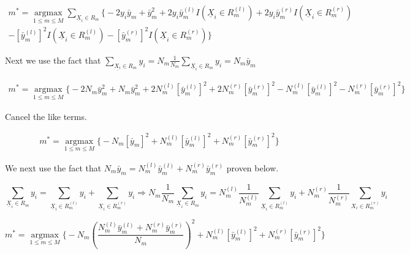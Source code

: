 \documentclass[11pt]{article}
\begin{document}
\begin{equation}
\begin{split}
m^* = \underset{1 \leq m \leq M}{\operatorname{argmax}} 
\sum_{\underline{X}_i \in R_m} \Bigg\{-2y_i\bar{y}_m + \bar{y}_m^2 + 
2y_i\bar{y}_m^{(l)}I(\underline{X}_i \in R_m^{(l)}) + 
2y_i\bar{y}_m^{(r)}I(\underline{X}_i \in R_m^{(r)})\\ 
- [\bar{y}_m^{(l)}]^2I(\underline{X}_i \in R_m^{(l)}) - 
[\bar{y}_m^{(r)}]^2I(\underline{X}_i \in R_m^{(r)})\Bigg\}
\end{split}
\end{equation}

Next we use the fact that 
$\sum_{\underline{X_i} \in R_m} y_i = N_m\frac{1}{N_m} 
\sum_{\underline{X}_i \in R_m}y_i = N_m \bar{y}_m$

\begin{equation}
\begin{split}
m^* = \underset{1 \leq m \leq M}{\operatorname{argmax}} 
\Bigg\{-2N_m\bar{y}_m^2 +N_m\bar{y}_m^2 + 2N_m^{(l)}[\bar{y}_m^{(l)}]^2 +
 2N_m^{(r)}[\bar{y}_m^{(r)}]^2  -N_m^{(l)}[\bar{y}_m^{(l)}]^2 -N_m^{(r)}
 [\bar{y}_m^{(r)}]^2\Bigg\}
\end{split}
\end{equation}

Cancel the like terms. 

\begin {equation}
\begin{split}
m^* = \underset{1 \leq m \leq M}{\operatorname{argmax}} 
\Bigg\{-N_m[\bar{y}_m]^2 + N_m^{(l)}[\bar{y}_m^{(l)}]^2 
+N_m^{(r)}[\bar{y}_m^{(r)}]^2\Bigg\}
\end{split}
\end{equation}

We next use the fact that $N_m\bar{y}_m = N_m^{(l)}\bar{y}_m^{(l)} + 
N_m^{(r)}\bar{y}_m^{(r)}$ proven below.

$$ \sum_{\underline{X}_i \in R_m} y_i = \sum_{\underline{X}_i 
\in R_m^{(l)}}y_i + \sum_{\underline{X}_i \in R_m^{(r)}} y_i 
\Rightarrow N_m \frac{1}{N_m} \sum_{\underline{X}_i 
\in R_m}y_i = N_m^{(l)}\frac{1}{N_m^{(l)}} 
\sum_{\underline{X}_i \in R_m^{(l)}}y_i + N_m^{(r)}\frac{1}
{N_m^{(r)}}\sum_{X_i \in R_m^{(r)}}y_i $$

\begin {equation}
m^* = \underset{1 \leq m \leq M}{\operatorname{argmax}} 
\Bigg\{ -N_m ( \frac{N_m^{(l)}\bar{y}_m^{(l)} + 
N_m^{(r)}\bar{y}_m^{(r)}}{N_m})^2 + N_m^{(l)}[\bar{y}_m^{(l)}]^2 + 
N_m^{(r)}[\bar{y}_m^{(r)}]^2\Bigg\}
\end{equation}
\end{document}
